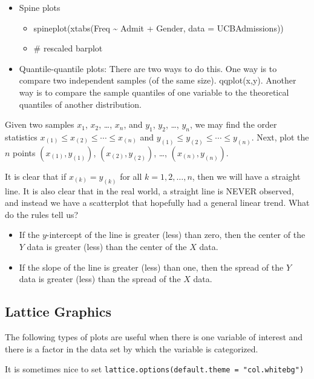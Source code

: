 \documentclass[10pt,english]{scrbook}
\begin{document}
\begin{itemize}
\item Spine plots
\begin{itemize}
\item spineplot(xtabs(Freq \textasciitilde{} Admit + Gender, data = UCBAdmissions))
\item \# rescaled barplot
\end{itemize}

\item Quantile-quantile plots: There are two ways to do this. One way is to compare two independent samples (of the same size). qqplot(x,y). Another way is to compare the sample quantiles of one variable to the theoretical quantiles of another distribution.
\end{itemize}


Given two samples \(x_{1}\), \(x_{2}\), \ldots{}, \(x_{n}\), and \(y_{1}\), \(y_{2}\), \ldots{}, \(y_{n}\), we may find the order statistics \(x_{(1)}\leq x_{(2)}\leq\cdots\leq x_{(n)}\) and \(y_{(1)}\leq y_{(2)}\leq\cdots\leq y_{(n)}\). Next, plot the \(n\) points \((x_{(1)},y_{(1)})\), \((x_{(2)},y_{(2)})\), \ldots{}, \((x_{(n)},y_{(n)})\).

It is clear that if \(x_{(k)}=y_{(k)}\) for all \(k=1,2,\ldots,n\), then we will have a straight line. It is also clear that in the real world, a straight line is NEVER observed, and instead we have a scatterplot that hopefully had a general linear trend. What do the rules tell us? 

\begin{itemize}
\item If the \(y\)-intercept of the line is greater (less) than zero, then the center of the \(Y\) data is greater (less) than the center of the \(X\) data.

\item If the slope of the line is greater (less) than one, then the spread of the \(Y\) data is greater (less) than the spread of the \(X\) data.
\end{itemize}
\subsection[Lattice Graphics]{Lattice Graphics}
\label{sec-1-6-3}

The following types of plots are useful when there is one variable of interest and there is a factor in the data set by which the variable is categorized. 

It is sometimes nice to set \texttt{lattice.options(default.theme = "col.whitebg")}
\end{document}
